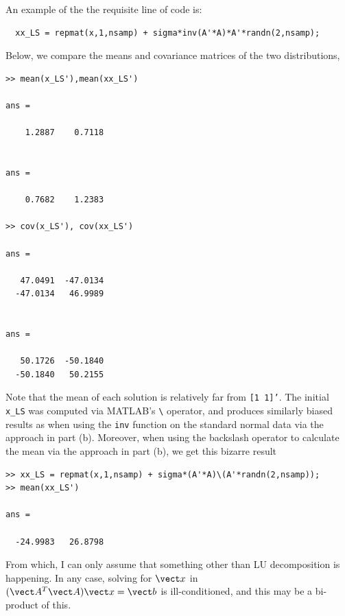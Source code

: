 \documentclass{homework}
\begin{document}
\begin{longproblem}
\begin{solution}
  An example of the the requisite line of code is:
  \begin{lstlisting}
  xx_LS = repmat(x,1,nsamp) + sigma*inv(A'*A)*A'*randn(2,nsamp);
  \end{lstlisting}
Below, we compare the means and covariance matrices of the two distributions,
  \begin{lstlisting}
>> mean(x_LS'),mean(xx_LS') 

ans =

    1.2887    0.7118


ans =

    0.7682    1.2383

>> cov(x_LS'), cov(xx_LS') 
 
ans =

   47.0491  -47.0134
  -47.0134   46.9989


ans =

   50.1726  -50.1840
  -50.1840   50.2155
\end{lstlisting}

  Note that the mean of each solution is relatively far from \texttt{[1 1]'}.
  The initial \texttt{x\_LS} was computed via MATLAB's \texttt{\textbackslash}
  operator, and produces similarly biased results as when using the
  \texttt{inv} function on the standard normal data via the approach in part (b).  Moreover, when using the backslash
  operator to calculate the mean via the approach in part (b), we get this bizarre result
  \begin{lstlisting}
>> xx_LS = repmat(x,1,nsamp) + sigma*(A'*A)\(A'*randn(2,nsamp));  
>> mean(xx_LS') 

ans =

  -24.9983   26.8798
  \end{lstlisting}
  From which, I can only assume that something other than LU decomposition is happening.  In any case, solving for $\vect x$ in $(\vect A^T\vect A) \vect x = \vect b$ is ill-conditioned, and this may be a bi-product of this.


\end{solution}
\end{longproblem}
\end{document}
